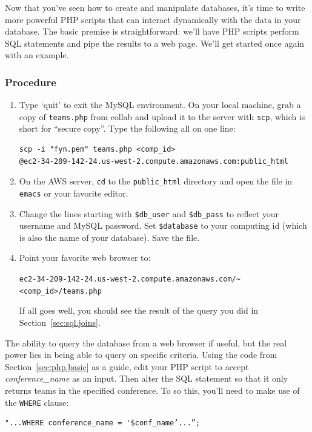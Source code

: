 \documentclass[11pt]{article} %
\begin{document}
Now that you’ve seen how to create and manipulate databases, it’s time to write more powerful PHP scripts that can interact dynamically with the data in your database. The basic premise is straightforward: we’ll have PHP scripts perform SQL statements and pipe the results to a web page. We’ll get started once again with an example.

\subsubsection*{Procedure}

\begin{enumerate}
\item Type ‘quit’ to exit the MySQL environment. On your local machine, grab a copy of \verb|teams.php| from collab and upload it to the server with \verb|scp|, which is short for “secure copy”. Type the following all on one line:
\begin{verbatim}
scp -i "fyn.pem" teams.php <comp_id>
@ec2-34-209-142-24.us-west-2.compute.amazonaws.com:public_html
\end{verbatim}
\item On the AWS server, \verb|cd| to the \verb|public_html| directory and open the file in \verb|emacs| or your favorite editor.
\item Change the lines starting with \verb|$db_user| and \verb|$db_pass| to reflect your username and MySQL password. Set \verb|$database| to your computing id (which is also the name of your database). Save the file.
\item Point your favorite web browser to:
 
\verb|ec2-34-209-142-24.us-west-2.compute.amazonaws.com/~<comp_id>/teams.php|

If all goes well, you should see the result of the query you did in Section~\ref{sec:sql.joins}.
\end{enumerate}

The ability to query the database from a web browser if useful, but the real power lies in being able to query on specific criteria. Using the code from Section~\ref{sec:php.basic} as a guide, edit your PHP script to accept \emph{conference\_name} as an input. Then alter the SQL statement so that it only returns teams in the specified conference. To so this, you’ll need to make use of the \verb|WHERE| clause:

\begin{verbatim}
"...WHERE conference_name = '$conf_name’...”;
\end{verbatim}
\end{document}

